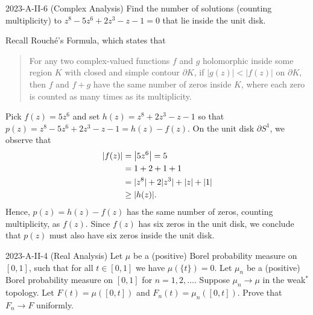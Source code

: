\documentclass{article}
\begin{document}
\begin{prb}{2023-A-II-6 (Complex Analysis)}
	Find the number of solutions (counting multiplicity) to $z^{8} - 5z^{6} + 2z^{3} - z - 1 = 0$ that lie inside the unit disk. 
\end{prb}
\begin{solutions}
	Recall Rouch{\'e}'s Formula, which states that 
		\begin{quote}
			For any two complex-valued functions $f$ and $g$ holomorphic inside some region $K$ with closed and simple contour $\partial K$, if $|g(z)| < |f(z)|$ on $\partial K$, then $f$ and $f +g$ have the same number of zeros inside $K$, where each zero is counted as many times as its multiplicity. 
		\end{quote} 
	Pick $f(z) = 5z^{6}$ and set $h(z) = z^{8} + 2z^{3} - z - 1$ so that $p(z) = z^{8} - 5z^{6} + 2z^{3} - z - 1 = h(z) - f(z)$. On the unit disk $\partial S^{1}$, we observe that 
		\begin{align}
			\begin{split}
				\left| f(z) \right| &= \left| 5z^{6} \right| = 5 \\
				&= 1 + 2 + 1 + 1 \\
				&= |z^{8}| + 2|z^{3}| + |z| + |1| \\
				&\geq |h(z)|. 
			\end{split}
		\end{align}
	Hence, $p(z) = h(z) - f(z)$ has the same number of zeros, counting multiplicity, as $f(z)$. Since $f(z)$ has six zeros in the unit disk, we conclude that $p(z)$ must also have six zeros inside the unit disk. 
\end{solutions}


\begin{prb}{2023-A-II-4 (Real Analysis)}
	Let $\mu$ be a (positive) Borel probability measure on $[0,1]$, such that for all $t \in [0,1]$ we have $\mu(\{t\}) = 0$. Let $\mu_{n}$ be a (positive) Borel probability measure on $[0,1]$ for $n = 1, 2, \ldots$. Suppose $\mu_{n} \to \mu$ in the weak$^{\ast}$ topology. Let $F(t)=  \mu([0,t])$ and $F_{n}(t)  = \mu_{n}([0,t])$. Prove that $F_{n} \to F$ uniformly. 
\end{prb}
\end{document}
